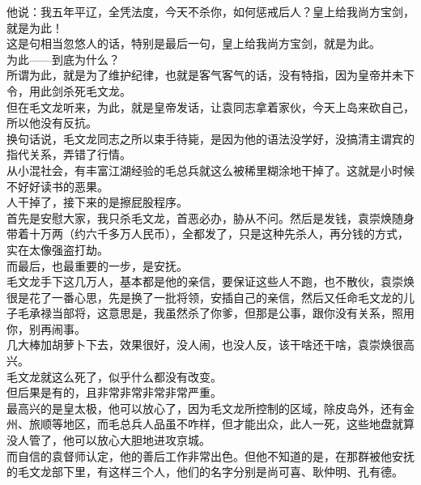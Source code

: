 \begin{multicols}{\theparacolNo}
他说：我五年平辽，全凭法度，今天不杀你，如何惩戒后人？皇上给我尚方宝剑，就是为此！\\

这是句相当忽悠人的话，特别是最后一句，皇上给我尚方宝剑，就是为此。\\

为此——到底为什么？\\

所谓为此，就是为了维护纪律，也就是客气客气的话，没有特指，因为皇帝并未下令，用此剑杀死毛文龙。\\

但在毛文龙听来，为此，就是皇帝发话，让袁同志拿着家伙，今天上岛来砍自己，所以他没有反抗。\\

换句话说，毛文龙同志之所以束手待毙，是因为他的语法没学好，没搞清主谓宾的指代关系，弄错了行情。\\

从小混社会，有丰富江湖经验的毛总兵就这么被稀里糊涂地干掉了。这就是小时候不好好读书的恶果。\\

人干掉了，接下来的是擦屁股程序。\\

首先是安慰大家，我只杀毛文龙，首恶必办，胁从不问。然后是发钱，袁崇焕随身带着十万两（约六千多万人民币），全都发了，只是这种先杀人，再分钱的方式，实在太像强盗打劫。\\

而最后，也最重要的一步，是安抚。\\

毛文龙手下这几万人，基本都是他的亲信，要保证这些人不跑，也不散伙，袁崇焕很是花了一番心思，先是换了一批将领，安插自己的亲信，然后又任命毛文龙的儿子毛承禄当部将，这意思是，我虽然杀了你爹，但那是公事，跟你没有关系，照用你，别再闹事。\\

几大棒加胡萝卜下去，效果很好，没人闹，也没人反，该干啥还干啥，袁崇焕很高兴。\\

毛文龙就这么死了，似乎什么都没有改变。\\

但后果是有的，且非常非常非常非常严重。\\

最高兴的是皇太极，他可以放心了，因为毛文龙所控制的区域，除皮岛外，还有金州、旅顺等地区，而毛总兵人品虽不咋样，但才能出众，此人一死，这些地盘就算没人管了，他可以放心大胆地进攻京城。\\

而自信的袁督师认定，他的善后工作非常出色。但他不知道的是，在那群被他安抚的毛文龙部下里，有这样三个人，他们的名字分别是尚可喜、耿仲明、孔有德。\\


\end{multicols}
